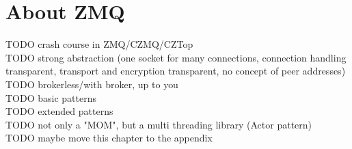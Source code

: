 \chapter{About ZMQ}

TODO crash course in ZMQ/CZMQ/CZTop\\
TODO strong abstraction (one socket for many connections, connection handling transparent, transport and encryption transparent, no concept of peer addresses)\\
TODO brokerless/with broker, up to you\\
TODO basic patterns\\
TODO extended patterns\\
TODO not only a "MOM", but a multi threading library (Actor pattern)\\
TODO maybe move this chapter to the appendix

